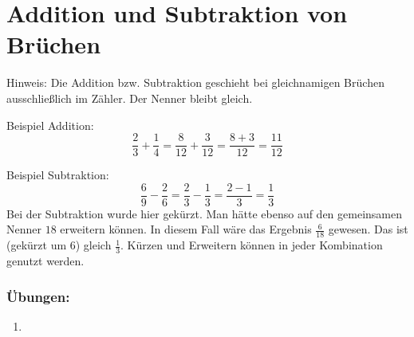 	\section{Addition und Subtraktion von Brüchen}\vspace{-1em}

Hinweis: Die Addition bzw. Subtraktion geschieht bei gleichnamigen Brüchen ausschließlich im Zähler. Der Nenner bleibt gleich.

Beispiel Addition:
\begin{equation*}
	\frac{2}{3}+\frac{1}{4}= \frac{8}{12}+\frac{3}{12}= \frac{8+3}{12}=\frac{11}{12}
\end{equation*}

Beispiel Subtraktion:
\begin{equation*}
	\frac{6}{9}-\frac{2}{6}= \frac{2}{3}-\frac{1}{3}= \frac{2-1}{3}=\frac{1}{3}
\end{equation*}
Bei der Subtraktion wurde hier gekürzt. Man hätte ebenso auf den gemeinsamen Nenner $18$ erweitern können. In diesem Fall wäre das Ergebnis $\frac{6}{18}$ gewesen. Das ist (gekürzt um $6$) gleich $\frac{1}{3}$. Kürzen und Erweitern können in jeder Kombination genutzt werden.

\subsubsection*{Übungen:}\vspace{-1em}
\begin{enumerate}[label=\alph*)]
	\item  {}
\end{enumerate}